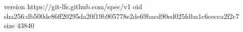 version https://git-lfs.github.com/spec/v1
oid sha256:db500de86ff20295da20f19b905778e2de69bacd90ed025fdba1c6cecca2f2c7
size 43840
